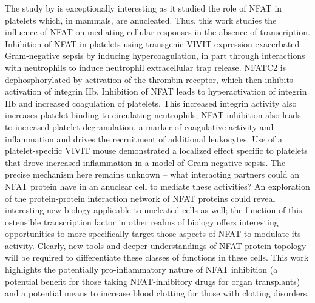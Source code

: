 The study by \citet{Poli2022} is exceptionally interesting as it studied the role of NFAT in platelets which, in mammals, are anucleated. Thus, this work studies the influence of NFAT on mediating cellular responses in the absence of transcription. Inhibition of NFAT in platelets using transgenic VIVIT expression exacerbated Gram-negative sepsis by inducing hypercoagulation, in part through interactions with neutrophils to induce neutrophil extracellular trap release. NFATC2 is dephosphorylated by activation of the thrombin receptor, which then inhibits activation of integrin \textalpha IIb. Inhibition of NFAT leads to hyperactivation of integrin \textalpha IIb and increased coagulation of platelets. This increased integrin activity also increases platelet binding to circulating neutrophils; NFAT inhibition also leads to increased platelet degranulation, a marker of coagulative activity and inflammation and drives the recruitment of additional leukocytes. Use of a platelet-specific VIVIT mouse demonstrated a localized effect specific to platelets that drove increased inflammation in a model of Gram-negative sepsis. The precise mechanism here remains unknown -- what interacting partners could an NFAT protein have in an anuclear cell to mediate these activities? An exploration of the protein-protein interaction network of NFAT proteins could reveal interesting new biology applicable to nucleated cells as well; the function of this ostensible transcription factor in other realms of biology offers interesting opportunities to more specifically target those aspects of NFAT to modulate its activity. Clearly, new tools and deeper understandings of NFAT protein topology will be required to differentiate these classes of functions in these cells. This work highlights the potentially pro-inflammatory nature of NFAT inhibition (a potential benefit for those taking NFAT-inhibitory drugs for organ transplants) and a potential means to increase blood clotting for those with clotting disorders.

